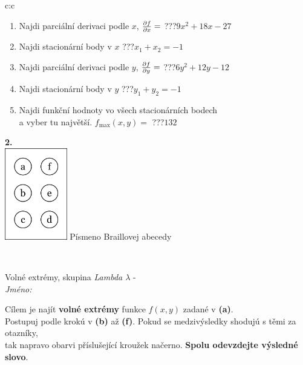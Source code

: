 \documentclass[10pt]{report}
\begin{document}
\begin{tabular}{c:c}
\begin{minipage}[c][104.5mm][t]{0.5\linewidth}
\begin{center}
\begin{minipage}{0.79\linewidth}
\begin{center}
\begin{varwidth}{\linewidth}
\begin{enumerate}
\item Najdi parciální derivaci podle $x$, $\pdv{f}{x}=$\quad \dotfill\; ???\;\dotfill \quad $9x^2+18x-27$
\item Najdi stacionární body v $x$\quad \dotfill\; ???\;\dotfill \quad $x_1+x_2=-1$
\item Najdi parciální derivaci podle $y$, $\pdv{f}{y}=$\quad \dotfill\; ???\;\dotfill \quad $6y^2+12y-12$
\item Najdi stacionární body v $y$\quad \dotfill\; ???\;\dotfill \quad $y_1+y_2=-1$
\item Najdi funkční hodnoty vo všech stacionárních bodech \\ \phantom{xxxxxx} a vyber tu najvětší. $f_{\text{max}}(x,y)=$\quad \dotfill\; ???\;\dotfill \quad $132$
\end{enumerate}
\end{varwidth}
\end{center}
\end{minipage}
\begin{minipage}{0.20\linewidth}
\begin{center}
{\Huge\bfseries 2.} \\[2mm]
\includegraphics[height=40mm]{../images/braille.png}
{\small Písmeno Braillovej abecedy}
\end{center}
\end{minipage}
\end{center}
\end{minipage}
\\ \hdashline
\begin{minipage}[c][104.5mm][t]{0.5\linewidth}
\begin{center}
\vspace{7mm}
{\huge Volné extrémy, skupina \textit{Lambda $\lambda$} -}\\[5mm]
\textit{Jméno:}\phantom{xxxxxxxxxxxxxxxxxxxxxxxxxxxxxxxxxxxxxxxxxxxxxxxxxxxxxxxxxxxxxxxxx}\\[5mm]
\begin{minipage}{0.95\linewidth}
\begin{center}
Cílem je najít \textbf{volné extrémy} funkce $f(x,y)$ zadané v \textbf{(a)}.\\Postupuj podle krokú v \textbf{(b)} až \textbf{(f)}. Pokud se medzivýsledky shodujú s těmi za otazníky,\\tak napravo obarvi příslušející kroužek načerno. \textbf{Spolu odevzdejte výsledné slovo}.

\end{center}
\end{minipage}
\end{center}
\end{minipage}
\end{tabular}
\end{document}
